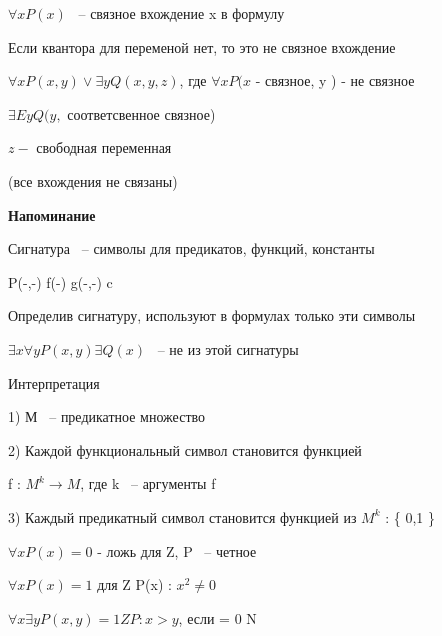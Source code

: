 \documentclass[russian]{lecture-notes}
\begin{document}
    \begin{definition}

        $\forall x P(x)$ ~-- связное вхождение x в формулу

        \end{definition}

    Если квантора для переменой нет, то это не связное вхождение

    $\forall x P(x,y) \lor \exists y Q(x,y,z)$, где $\forall x P(x $ - связное, y ) - не связное

    $\exists E y Q(y,$ соответсвенное связное)

    $z - $ свободная переменная

    (все вхождения не связаны)

    \textbf{Напоминание}

    Сигнатура ~-- символы для предикатов, функций, константы

    \begin{example}

        P(-,-) f(-) g(-,-) c

        \end{example}

    Определив сигнатуру, используют в формулах только эти символы

    $\exists x \forall y P(x,y) \exists Q(x)$ ~-- не из этой сигнатуры

    \begin{definition}

        Интерпретация

        1) М ~-- предикатное множество

        2) Каждой функциональный символ становится функцией

        f : $M^{k} \rightarrow M$, где k ~-- аргументы f

        \end{definition}

    3) Каждый предикатный символ становится функцией из $M^{k}$ : \{ 0,1 \}

    \begin{example}

        $\forall x P(x) = 0 $ - ложь для Z, P ~-- четное

        $\forall x P(x) = 1$ для Z P(x) : $x^{2} \neq 0 $

        $\forall x \exists y P(x,y) = 1 ZP:x>y$, если = 0 N


        \end{example}
\end{document}
